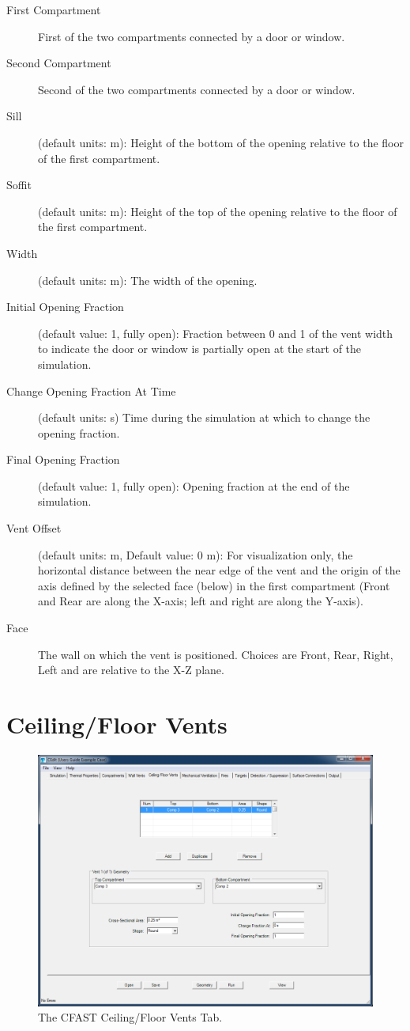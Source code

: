 \begin{description}
\item[First Compartment] First of the two compartments connected by a door or window.
\item[Second Compartment] Second of the two compartments connected by a door or window.
\item[Sill] (default units: m): Height of the bottom of the opening relative to the floor of the first compartment.
\item[Soffit] (default units: m): Height of the top of the opening relative to the floor of the first compartment.
\item[Width] (default units: m): The width of the opening.
\item[Initial Opening Fraction] (default value: 1, fully open): Fraction between 0 and 1 of the vent width to indicate the door or window is partially open at the start of the simulation.
\item[Change Opening Fraction At Time]  (default units: s)  Time during the simulation at which to change the opening fraction.
\item[Final Opening Fraction] (default value: 1, fully open): Opening fraction at the end of the simulation.
\item[Vent Offset] (default units: m, Default value: 0 m): For visualization only, the horizontal distance between the near edge of the vent and the origin of the axis defined by the selected face (below) in the first compartment (Front and Rear are along the X-axis; left and right are along the Y-axis).
\item[Face] The wall on which the vent is positioned.  Choices are Front, Rear, Right, Left and are relative to the X-Z plane.
\end{description}



\section{Ceiling/Floor Vents}

\begin{figure}[h!]
\includegraphics[width=6.5in]{FIGURES/Vertical_Flow_Tab}
\caption[The CFAST Ceiling/Floor Vents Tab]{The CFAST Ceiling/Floor Vents Tab.}
\end{figure}

